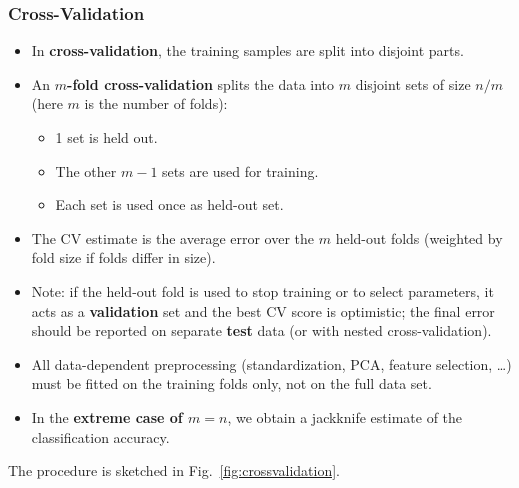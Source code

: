 \subsubsection{Cross-Validation}
  
  \begin{itemize}
    \item In \textbf{cross-validation}, the training samples are split into disjoint parts.
    \item An \textbf{$m$-fold cross-validation} splits the data into $m$ disjoint sets of size $n/m$ (here $m$ is the number of folds):
      \begin{itemize}
        \item 1 set is held out.
        \item The other $m-1$ sets are used for training.
        \item Each set is used once as held-out set.
      \end{itemize}
    \item The CV estimate is the average error over the $m$ held-out folds (weighted by fold size if folds differ in size).
    \item Note: if the held-out fold is used to stop training or to select parameters, it acts as a \textbf{validation} set and the best CV score is optimistic; the final error should be reported on separate \textbf{test} data (or with nested cross-validation).
    \item All data-dependent preprocessing (standardization, PCA, feature selection, \dots) must be fitted on the training folds only, not on the full data set.
    \item In the \textbf{extreme case of $m=n$}, we obtain a jackknife estimate of the classification accuracy.
  \end{itemize}
  The procedure is sketched in Fig.~\ref{fig:crossvalidation}.

